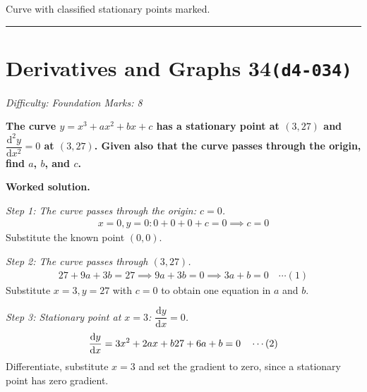 \documentclass[11pt]{article}
\newcommand{\question}[1]{\par\medskip\noindent\textbf{#1}\par}
\begin{document}
\begin{center}
{
}
\end{center}
\small Curve with classified stationary points marked.\normalsize

\medskip\hrule

\section*{Derivatives and Graphs 34\quad\small\texttt{(d4-034)}}
\textit{Difficulty: Foundation \quad\textbar\quad Marks: 8}

\question{The curve \( y = x^3 + ax^2 + bx + c \) has a stationary point at \( (3, 27) \) and \( \dfrac{\mathrm{d}^2y}{\mathrm{d}x^2} = 0 \) at \( (3, 27) \). Given also that the curve passes through the origin, find \( a \), \( b \), and \( c \).}

\textbf{Worked solution.}

\textit{Step 1: The curve passes through the origin: \( c = 0 \).}
\[\begin{gathered}
x=0, y=0: 0+0+0+c=0 \implies c=0
\end{gathered}\]
Substitute the known point \( (0,0) \).

\textit{Step 2: The curve passes through \( (3, 27) \).}
\[\begin{gathered}
27 + 9a + 3b = 27 \implies 9a + 3b = 0 \implies 3a + b = 0 \quad \cdots (1)
\end{gathered}\]
Substitute \( x=3, y=27 \) with \( c = 0 \) to obtain one equation in \( a \) and \( b \).

\textit{Step 3: Stationary point at \( x = 3 \): \( \dfrac{\mathrm{d}y}{\mathrm{d}x} = 0 \).}
\[\begin{gathered}
\frac{\mathrm{d}y}{\mathrm{d}x} = 3x^2 + 2ax + b \newline 27 + 6a + b = 0 \quad \cdots (2)
\end{gathered}\]
Differentiate, substitute \( x = 3 \) and set the gradient to zero, since a stationary point has zero gradient.
\end{document}
